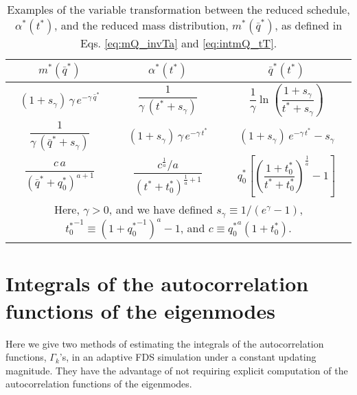 \documentclass[preprint, superscriptaddress, floatfix]{revtex4-1}
\begin{document}
\begin{table}[h]
  \caption{\label{tab:m_and_a}
    Examples of the variable transformation between the
    reduced schedule, $\alpha^*(t^*)$,
    and the reduced mass distribution, $m^*(\bar q^*)$,
    as defined in Eqs. \eqref{eq:mQ_invTa}
    and \eqref{eq:intmQ_tT}.
  }
  \setlength{\tabcolsep}{2pt} %
  \renewcommand\arraystretch{2.0} %
  \begin{tabular} { c c c }
    \hline
    $m^*(\bar q^*)$ &
    $\alpha^*(t^*)$ &
    $\bar q^*(t^*)$
    \\
    \hline
    $(1+ s_\gamma) \, \gamma \, e^{-\gamma \, {\bar q}^*}$ &
    $\dfrac{1}{ \gamma \, (t^* + s_\gamma) }$ &
    $\dfrac{1}{\gamma} \ln\left(\dfrac{1 + s_\gamma}{t^* + s_\gamma} \right)$
    \\
    $\dfrac{1}{\gamma \, ({\bar q}^* + s_\gamma) }$ &
    $(1 + s_\gamma) \, \gamma \, e^{-\gamma \, t^*}$ &
    $(1 + s_\gamma) \, e^{-\gamma \, t^*} - s_\gamma$
    \\
    $\dfrac{c \, a}{\left( {\bar q}^* + q^*_0 \right)^{a+1}}$ &
    $\dfrac{c^{\frac 1 a} / a}{\left( t^* + t^*_0 \right)^{\frac{1}{a}+1}}$ &
    $q^*_0 \left[\left( \dfrac{1+t^*_0}{t^* + t^*_0} \right)^{\!\frac{1}{a}} \!- 1\right]$
    \\
    \hline
    \multicolumn{3}{p{8cm}}{
    Here,
    $\gamma > 0$,
    and we have defined
    $s_\gamma \equiv 1/(e^\gamma - 1)$,
    ${t^*_0}^{-1} \equiv \left(1+{q^*_0}^{-1}\right)^a - 1$,
    and
    $c \equiv {q^*_0}^a(1 + t^*_0)$.
    } \\
    \hline
  \end{tabular}
\end{table}




\section{\label{sec:Gamma_measure}
Integrals of the autocorrelation functions of the eigenmodes
}



Here we give two methods of estimating
the integrals of the autocorrelation functions, $\Gamma_k$'s,
in an adaptive FDS simulation
under a constant updating magnitude.
%
They have the advantage of not requiring
explicit computation of
the autocorrelation functions of the eigenmodes.
\end{document}
